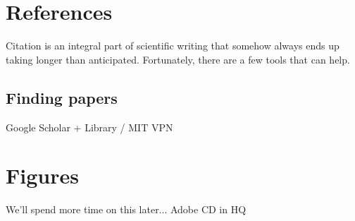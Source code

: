\documentclass{article}
\begin{document}
\section*{References}
Citation is an integral part of scientific writing that somehow always ends up taking longer than anticipated. Fortunately, there are a few tools that can help.

\subsection*{Finding papers}
Google Scholar + Library / MIT VPN

\section*{Figures}
We'll spend more time on this later... Adobe CD in HQ
\end{document}
